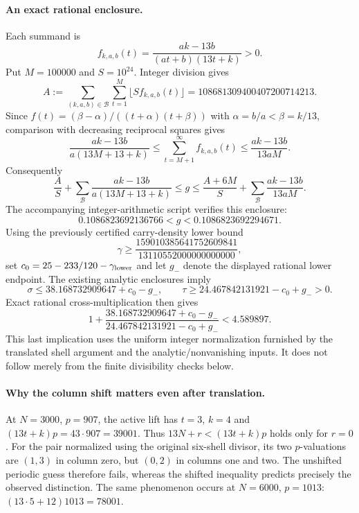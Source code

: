 \paragraph{An exact rational enclosure.}
Each summand is
\[
 f_{k,a,b}(t)=\frac{ak-13b}{(at+b)(13t+k)}>0.
\]
Put $M=100000$ and $S=10^{24}$. Integer division gives
\[
 A:=\sum_{(k,a,b)\in\mathcal B}\sum_{t=1}^{M}
          \lfloor S f_{k,a,b}(t)\rfloor
   =108681309400407200714213.
\]
Since $f(t)=(\beta-\alpha)/((t+\alpha)(t+\beta))$ with
$\alpha=b/a<\beta=k/13$, comparison with decreasing reciprocal squares gives
\[
 \frac{ak-13b}{a(13M+13+k)}
 \le \sum_{t=M+1}^{\infty}f_{k,a,b}(t)
 \le \frac{ak-13b}{13aM}.
\]
Consequently
\[
 \frac AS+\sum_{\mathcal B}\frac{ak-13b}{a(13M+13+k)}
 \le g\le
 \frac{A+6M}{S}+\sum_{\mathcal B}\frac{ak-13b}{13aM}.
\]
The accompanying integer-arithmetic script verifies this enclosure:
\[
 0.1086823692136766<g<0.1086823692294671.
\]
Using the previously certified carry-density lower bound
\[
 \gamma\ge\frac{159010385641752609841}{13110552000000000000},
\]
set $c_0=25-233/120-\gamma_{\rm lower}$ and let $g_-$ denote the displayed
rational lower endpoint. The existing analytic enclosures imply
\[
 \sigma\le38.168732909647+c_0-g_-,\qquad
 \tau\ge24.467842131921-c_0+g_->0.
\]
Exact rational cross-multiplication then gives
\[
 1+\frac{38.168732909647+c_0-g_-}
          {24.467842131921-c_0+g_-}
   <4.589897.
\]
This last implication uses the uniform integer normalization furnished by
the translated shell argument and the analytic/nonvanishing inputs.
It does not follow merely from the finite divisibility checks below.

\paragraph{Why the column shift matters even after translation.}
At $N=3000$, $p=907$, the active lift has $t=3$, $k=4$ and
$(13t+k)p=43\cdot907=39001$.
Thus $13N+r<(13t+k)p$ holds only for $r=0$.
For the pair normalized using the original six-shell divisor, its two
$p$-valuations are $(1,3)$ in column zero, but $(0,2)$ in columns one and
two. The unshifted periodic guess therefore fails, whereas the shifted
inequality predicts precisely the observed distinction.
The same phenomenon occurs at $N=6000$, $p=1013$:
$(13\cdot5+12)1013=78001$.
